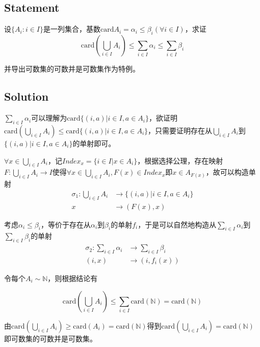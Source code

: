 \documentclass[UTF-8]{ctexart}
\begin{document}
\subsection{Statement}
设$\{A_i: i \in I\}$是一列集合，基数$\text{card}A_i = \alpha_i \le \beta_i(\forall i \in I)$，求证$$\text{card}(\bigcup_{i\in I}A_i) \le \sum_{i \in I}\alpha_i \le \sum_{i \in I}\beta_i$$

并导出可数集的可数并是可数集作为特例。
\subsection{Solution}

$\sum_{i \in I}\alpha_i$可以理解为$\text{card}\{(i, a) | i \in I, a \in A_i\}$，欲证明$\text{card}(\bigcup_{i\in I}A_i) \le \text{card}\{(i, a) | i \in I, a \in A_i\}$，只需要证明存在从$\bigcup_{i\in I}A_i$到$\{(i, a) | i \in I, a \in A_i\}$的单射即可。

$\forall x \in \bigcup_{i\in I}A_i$，记$Index_x = \{i \in I | x \in A_i\}$，根据选择公理，存在映射$F: \bigcup_{i\in I}A_i \to I$使得$\forall x \in \bigcup_{i\in I}A_i, F(x) \in Index_x$即$x \in A_{F(x)}$，故可以构造单射
\begin{align*}
	\sigma_1: \bigcup_{i\in I}A_i &\to \{(i, a) | i \in I, a \in A_i\}\\
	x &\to (F(x), x)
\end{align*}

考虑$\alpha_i \le \beta_i$，等价于存在从$\alpha_i$到$\beta_i$的单射$f_i$，于是可以自然地构造从$\sum_{i\in I}\alpha_i$到$\sum_{i\in I}\beta_i$的单射
\begin{align*}
\sigma_2: \sum_{i\in I}\alpha_i &\to \sum_{i\in I}\beta_i\\
(i, x) &\to (i, f_i(x))
\end{align*}

令每个$A_i \sim \mathbb N$，则根据结论有

$$\text{card}(\bigcup_{i\in I}A_i) \le \sum_{i \in I}\text{card}(\mathbb N) = \text{card}(\mathbb N)$$

由$\text{card}(\bigcup_{i\in I}A_i) \ge \text{card}(A_i) = \text{card}(\mathbb N)$得到$\text{card}(\bigcup_{i\in I}A_i) = \text{card}(\mathbb N)$即可数集的可数并是可数集。
\end{document}
